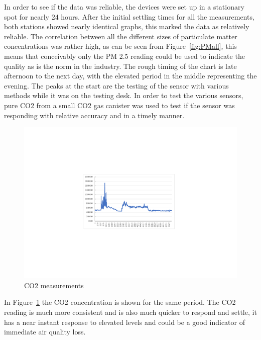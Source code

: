 \noindent
In order to see if the data was reliable, the devices were set up in a stationary spot for nearly 24 hours. After the initial settling times for all the measurements, both stations showed nearly identical graphs, this marked the data as relatively reliable.
The correlation between all the different sizes of particulate matter concentrations was rather high, as can be seen from Figure~\ref{fig:PMall}, this means that conceivably only  the PM 2.5 reading could be used to indicate the quality as is the norm in the industry. The rough timing of the chart is late afternoon to the next day, with the elevated period in the middle representing the evening.
The peaks at the start are the testing of the sensor with various methods while it was on the testing desk.
In order to test the various sensors, pure CO2 from a small CO2 gas canister was used to test if the sensor was responding with relative accuracy and in a timely manner.


\begin{figure}[!htb]
	\centering
	\includegraphics[width=0.7\linewidth]{body/fig/CO22.0.pdf}
	\caption{CO2 measurements}
	\label{fig:co2}
\end{figure}

\noindent
In Figure~\ref{fig:co2} the CO2 concentration is shown for the same period. The CO2 reading is much more consistent and is also much quicker to respond and settle, it has a near instant response to elevated levels and could be a good indicator of immediate air quality loss.%


